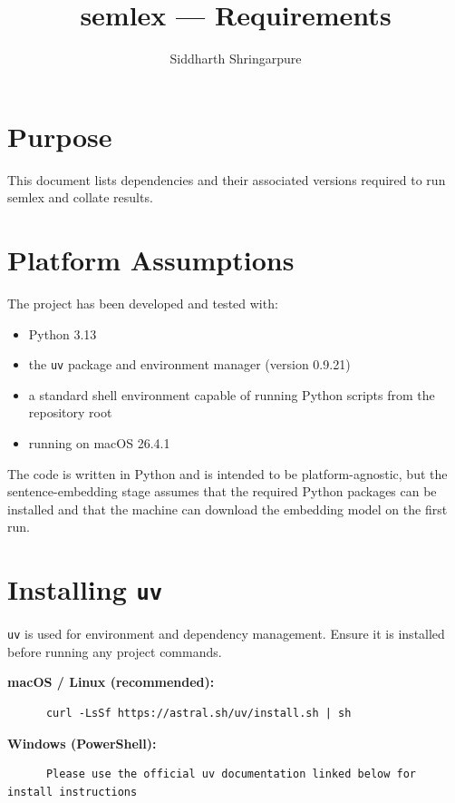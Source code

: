 \documentclass[10pt,a4paper]{article}
\title{semlex --- Requirements}
\author{Siddharth Shringarpure}
\date{}
\begin{document}
\singlespacing
\pagestyle{plain}
\maketitle

\section{Purpose}

This document lists dependencies and their associated versions required to run semlex and collate results.


\section{Platform Assumptions}

The project has been developed and tested with:
\begin{itemize}
      \item Python 3.13
      \item the \texttt{uv} package and environment manager (version 0.9.21)
      \item a standard shell environment capable of running Python scripts from the
      repository root
      \item running on macOS 26.4.1
\end{itemize}

The code is written in Python and is intended to be platform-agnostic, but the sentence-embedding stage assumes that the required Python packages can be installed and that the machine can download the embedding model on the first run.


\section{Installing \texttt{uv}}

\texttt{uv} is used for environment and dependency management. Ensure it is installed before running any project commands.

\textbf{macOS / Linux (recommended):}
\begin{verbatim}
      curl -LsSf https://astral.sh/uv/install.sh | sh
\end{verbatim}

\textbf{Windows (PowerShell):}
\begin{verbatim}
      Please use the official uv documentation linked below for install instructions
\end{verbatim}
\end{document}
